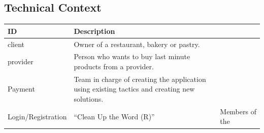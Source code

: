 \subsection{Technical Context}

\begin{table}[H]
    \begin{tabularx}{\textwidth}{lX}
    \toprule
    ID & Description   \\
    \midrule
    \gls{client} & Owner of a restaurant, bakery or pastry. \\
    \gls{provider} & Person who wants to buy last minute products from a provider. \\
    Payment & Team in charge of creating the application using existing tactics and creating new solutions. \\
    Login/Registration & ``Clean Up the Word (R)'' & Members of the  \\
    \bottomrule
    \end{tabularx}
\end{table}